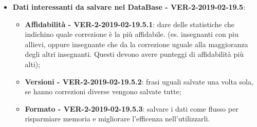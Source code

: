 \documentclass[a4paper, oneside, openany, dvipsnames, table]{article}
\begin{document}
\begin{itemize}
	\item \textbf{Dati interessanti da salvare nel DataBase - VER-2-2019-02-19.5}:
	\begin{itemize}
		\item \textbf{Affidabilità - VER-2-2019-02-19.5.1}: dare delle statistiche che indichino quale correzione è la più affidabile.
		(es. insegnanti con piu allievi, oppure insegnante che da la correzione uguale alla maggioranza degli 
		altri insegnanti. Questi devono avere punteggi di affidabilità più alti); 
		\item \textbf{Versioni - VER-2-2019-02-19.5.2}: frasi uguali salvate una volta sola, se hanno correzioni diverse vengono salvate tutte;
		\item \textbf{Formato - VER-2-2019-02-19.5.3}: salvare i dati come flusso per risparmiare memoria e migliorare l'efficenza nell'utilizzarli.
	\end{itemize}

\end{itemize}
\end{document}
